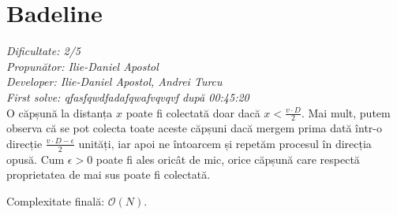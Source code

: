 \section{Badeline}
\textit{Dificultate: 2/5} \\
\textit{Propunător: Ilie-Daniel Apostol} \\
\textit{Developer: Ilie-Daniel Apostol, Andrei Turcu} \\
\textit{First solve: qfasfqwdfadafqwafvqvqvf după 00:45:20}  \\

O căpșună la distanța $x$ poate fi colectată doar dacă $x < \frac{v \cdot D}{2}$. Mai mult, putem observa că se pot colecta toate aceste căpșuni dacă mergem prima dată într-o direcție $\frac{v \cdot D - \epsilon}{2}$ unități, iar apoi ne întoarcem și repetăm procesul în direcția opusă. Cum $\epsilon > 0$ poate fi ales oricât de mic, orice căpșună care respectă proprietatea de mai sus poate fi colectată.

\medskip

Complexitate finală: $\mathcal{O}(N)$.
